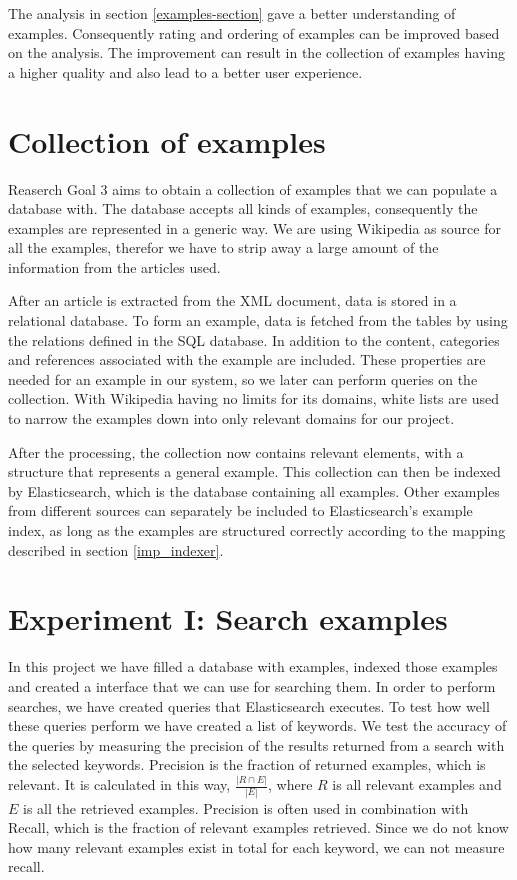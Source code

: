 The analysis in section \ref{examples-section} gave a better understanding of examples. Consequently rating and ordering of examples can be improved based on the analysis. 
The improvement can result in the collection of examples having a higher quality and also lead to a better user experience. 


\section{Collection of examples}
Reaserch Goal 3 aims to obtain a collection of examples that we can populate a database with. The database accepts all kinds of examples, consequently the examples are represented in a generic way. We are using Wikipedia as source for all the examples, therefor we have to strip away a large amount of the information from the articles used. 

After an article is extracted from the XML document, data is stored in a relational database. To form an example, data is fetched from the tables by using the relations defined in the SQL database. In addition to the content, categories and references associated with the example are included. These properties are needed for an example in our system, so we later can perform queries on the collection. With Wikipedia having no limits for its domains, white lists are used to narrow the examples down into only relevant domains for our project.

After the processing, the collection now contains relevant elements, with a structure that represents a general example. This collection can then be indexed by Elasticsearch, which is the database containing all examples. Other examples from different sources can separately be included to Elasticsearch's example index, as long as the examples are structured correctly according to the mapping described in section \ref{imp_indexer}.


\section{Experiment I: Search examples} \label{search_experiment}
In this project we have filled a database with examples, indexed those examples and created a interface that we can use for searching them. In order to perform searches, we have created queries that Elasticsearch executes. To test how well these queries perform we have created a list of keywords. We test the accuracy of the queries by measuring the precision of the results returned from a search with the selected  keywords. Precision is the fraction of returned examples, which is relevant. It is calculated in this way, \(\frac{|R \cap E |}{|E|}\), where \(R\) is all relevant examples and \(E\) is all the retrieved examples. Precision is often used in combination with Recall, which is the fraction of relevant examples retrieved. Since we do not know how many relevant examples exist in total for each keyword, we can not measure recall. 


